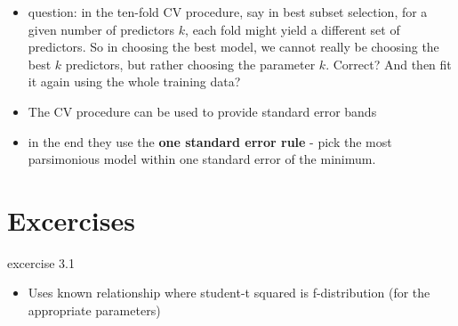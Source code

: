 \documentclass[a4paper]{report}
\newcommand{\red}{\color{red}}
\newcommand{\<}{\textless}
\renewcommand{\>}{\textgreater}
\begin{document}
\begin{itemize}
  \item {\red question: in the ten-fold CV procedure, say in best subset selection, for a given number of predictors $k$, each fold might yield a different set of predictors. So in choosing the best model, we cannot really be choosing the best $k$ predictors, but rather choosing the parameter $k$. Correct? And then fit it again using the whole training data?}
  \item The CV procedure can be used to provide standard error bands
  \item in the end they use the  {\bf one standard error rule} - pick the most parsimonious model within one standard error of the minimum.
\end{itemize}


\section{Excercises}

excercise 3.1
\begin{itemize}
  \item Uses known relationship where student-t squared is f-distribution (for the appropriate parameters)
\end{itemize}
\end{document}
